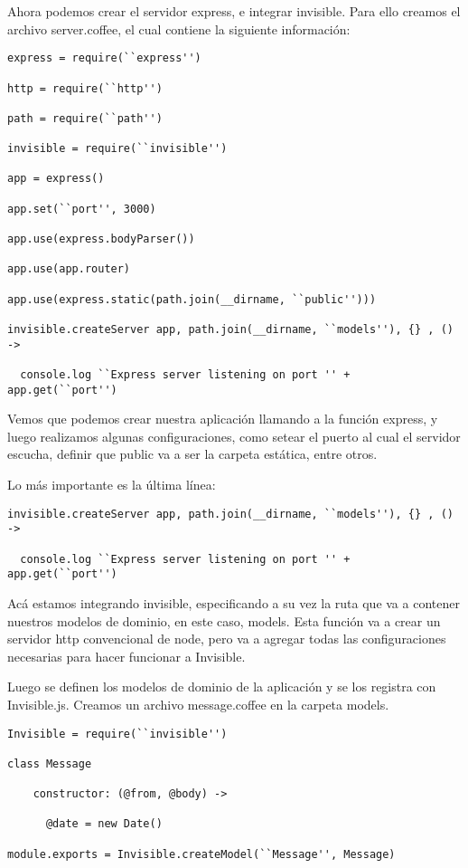 \documentclass[doc,helv,longtable]{article}
\begin{document}
Ahora podemos crear el servidor express, e integrar invisible. Para ello creamos el archivo server.coffee, el cual contiene la siguiente información:

\begin{verbatim}
express = require(``express'')

http = require(``http'')

path = require(``path'')

invisible = require(``invisible'')

app = express()

app.set(``port'', 3000)

app.use(express.bodyParser())

app.use(app.router)

app.use(express.static(path.join(__dirname, ``public'')))

invisible.createServer app, path.join(__dirname, ``models''), {} , () ->

  console.log ``Express server listening on port '' + app.get(``port'')
\end{verbatim}

Vemos que podemos crear nuestra aplicación llamando a la función express, y luego realizamos algunas configuraciones, como setear el puerto al cual el servidor escucha, definir que public va a ser la carpeta estática, entre otros.

Lo más importante es la última línea: 

\begin{verbatim}
invisible.createServer app, path.join(__dirname, ``models''), {} , () ->

  console.log ``Express server listening on port '' + app.get(``port'')
\end{verbatim}

Acá estamos integrando invisible, especificando a su vez la ruta que va a contener nuestros modelos de dominio, en este caso, models. Esta función va a crear un servidor http convencional de node, pero va a agregar todas las configuraciones necesarias para hacer funcionar a Invisible.

Luego se definen los modelos de dominio de la aplicación y se los registra con Invisible.js. Creamos un archivo message.coffee en la carpeta models.

\begin{verbatim}
Invisible = require(``invisible'')

class Message

    constructor: (@from, @body) ->

      @date = new Date()

module.exports = Invisible.createModel(``Message'', Message)
\end{verbatim}
\end{document}
